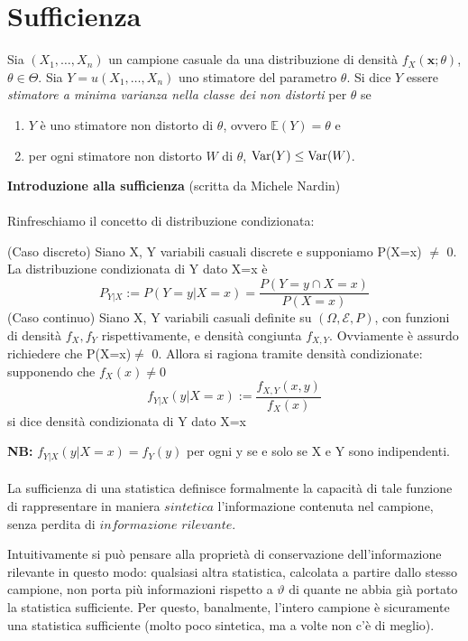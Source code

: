 
\chapter{Sufficienza}

\begin{dfn}
  Sia \((X_1,\dotsc,X_n)\) un campione casuale da una distribuzione di 
  densità \(f_X(\mathbf{x};\theta)\), \(\theta \in \Theta\). Sia
  \(Y = u(X_1,\dotsc,X_n)\) uno stimatore del parametro \(\theta\). Si dice
  \(Y\) essere \emph{stimatore a minima varianza nella classe dei non distorti} per \(\theta\) se
  \begin{enumerate}
    \item \(Y\) è uno stimatore non distorto di \(\theta\), ovvero
          \(\mathbb{E}(Y) = \theta\) e
    \item per ogni stimatore non distorto \(W\) di \(\theta\),
          \(\operatorname{Var}(Y) \le \operatorname{Var}(W)\).
  \end{enumerate}
\end{dfn}

\textbf{Introduzione alla sufficienza} (scritta da Michele Nardin)\\
\\
Rinfreschiamo il concetto di distribuzione condizionata:
\begin{definizione} (Caso discreto)
Siano X, Y variabili casuali discrete e supponiamo P(X=x) $\neq$ 0.
La distribuzione condizionata di Y dato X=x è 
$$P_{Y|X} := P(Y = y | X=x) = \frac{P(Y=y \cap X=x)}{P(X=x)}$$
(Caso continuo) Siano X, Y variabili casuali definite su $(\Omega, \mathcal{E}, P)$, con funzioni di densità $f_X, f_Y$ rispettivamente, e densità congiunta $f_{X,Y}$. Ovviamente è assurdo richiedere che P(X=x)$\neq$ 0. Allora si ragiona tramite densità condizionate: supponendo che $f_X(x)\neq 0$
$$f_{Y|X}(y | X=x):= \frac{f_{X,Y}(x,y)}{f_X(x)}$$ si dice densità condizionata di Y dato X=x 
\end{definizione}
\noindent \textbf{NB:} $f_{Y|X}(y | X=x) = f_Y(y)$ per ogni y se e solo se X e Y sono indipendenti.\\
\\
La sufficienza di una statistica definisce formalmente la capacità di tale funzione di rappresentare in maniera $sintetica$ l'informazione contenuta nel campione, senza perdita di $informazione$ $rilevante$.

Intuitivamente si può pensare alla proprietà di conservazione dell'informazione rilevante in questo modo: qualsiasi altra statistica, calcolata a partire dallo stesso campione, non porta più informazioni rispetto a $\vartheta$ di quante ne abbia già portato la statistica sufficiente.
Per questo, banalmente, l'intero campione è sicuramente una statistica sufficiente (molto poco sintetica, ma a volte non c'è di meglio).

